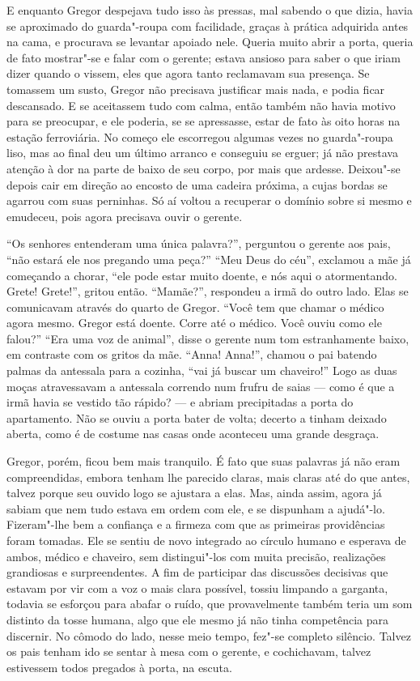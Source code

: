 E enquanto Gregor despejava tudo isso às pressas, mal sabendo o que dizia,
havia se aproximado do guarda"-roupa com facilidade, graças à prática
adquirida antes na cama, e procurava se levantar apoiado nele.
Queria muito abrir a porta, queria de fato mostrar"-se e falar com o
gerente; estava ansioso para saber o que iriam dizer quando o vissem, eles
que agora tanto reclamavam sua presença. Se tomassem um susto, Gregor não
precisava justificar mais nada, e podia ficar descansado. E se aceitassem
tudo com calma, então também não havia motivo para se preocupar, e ele
poderia, se se apressasse, estar de fato às oito horas na estação
ferroviária. No começo ele escorregou algumas vezes no guarda"-roupa liso,
mas ao final deu um último arranco e conseguiu se erguer; já não prestava
atenção à dor na parte de baixo de seu corpo, por mais que ardesse.
Deixou"-se depois cair em direção ao encosto de uma cadeira próxima, a cujas
bordas se agarrou com suas perninhas. Só aí voltou a recuperar o domínio
sobre si mesmo e emudeceu, pois agora precisava ouvir o gerente.

“Os senhores entenderam uma única palavra?”, perguntou o gerente aos pais,
“não estará ele nos pregando uma peça?” “Meu Deus do céu”, exclamou a mãe
já começando a chorar, “ele pode estar muito doente, e nós aqui o
atormentando. Grete! Grete!”, gritou então. “Mamãe?”, respondeu a irmã do
outro lado. Elas se comunicavam através do quarto de Gregor. “Você tem que
chamar o médico agora mesmo. Gregor está doente. Corre até o médico. Você
ouviu como ele falou?” “Era uma voz de animal”, disse o gerente num tom
estranhamente baixo, em contraste com os gritos da mãe. “Anna! Anna!”,
chamou o pai batendo palmas da antessala para a cozinha, “vai já buscar um
chaveiro!” Logo as duas moças atravessavam a antessala correndo num frufru
de saias --- como é que a irmã havia se vestido tão rápido? --- e abriam
precipitadas a porta do apartamento. Não se ouviu a porta bater de volta;
decerto a tinham deixado aberta, como é de costume nas casas onde
aconteceu uma grande desgraça.

Gregor, porém, ficou bem mais tranquilo. É fato que suas palavras já não
eram compreendidas, embora tenham lhe parecido claras, mais claras até do
que antes, talvez porque seu ouvido logo se ajustara a elas. Mas, ainda
assim, agora já sabiam que nem tudo estava em ordem com ele, e se
dispunham a ajudá"-lo. Fizeram"-lhe bem a confiança e a firmeza com que as
primeiras providências foram tomadas. Ele se sentiu de novo integrado ao
círculo humano e esperava de ambos, médico e chaveiro, sem distingui"-los
com muita precisão, realizações grandiosas e surpreendentes. A fim de
participar das discussões decisivas que estavam por vir com a voz o mais
clara possível, tossiu limpando a garganta, todavia se esforçou para
abafar o ruído, que provavelmente também teria um som distinto da tosse
humana, algo que ele mesmo já não tinha competência para discernir. No
cômodo do lado, nesse meio tempo, fez"-se completo silêncio. Talvez os pais
tenham ido se sentar à mesa com o gerente, e cochichavam, talvez
estivessem todos pregados à porta, na escuta.

